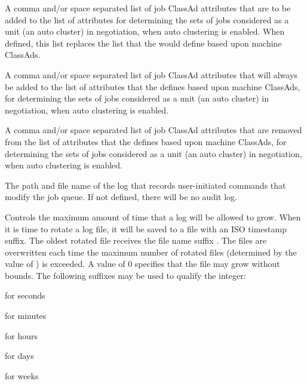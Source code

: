 \begin{description}
\label{param:SignificantAttributes}
\item[\Macro{SIGNIFICANT\_ATTRIBUTES}]
  A comma and/or space separated list of job ClassAd attributes that
  are to be added to the list of attributes for determining
  the sets of jobs considered as a unit (an auto cluster) in negotiation,
  when auto clustering is enabled.
  When defined, this list replaces the list that the  
  would define based upon machine ClassAds.

\label{param:AddSignificantAttributes}
\item[\Macro{ADD\_SIGNIFICANT\_ATTRIBUTES}]
  A comma and/or space separated list of job ClassAd attributes that
  will always be added to the list of attributes that the 
  defines based upon machine ClassAds, for determining
  the sets of jobs considered as a unit (an auto cluster) in negotiation,
  when auto clustering is enabled.

\label{param:RemoveSignificantAttributes}
\item[\Macro{REMOVE\_SIGNIFICANT\_ATTRIBUTES}]
  A comma and/or space separated list of job ClassAd attributes that
  are removed from the list of attributes that the 
  defines based upon machine ClassAds, for determining
  the sets of jobs considered as a unit (an auto cluster) in negotiation,
  when auto clustering is enabled.

\label{param:ScheddAuditLog}
\item[\Macro{SCHEDD\_AUDIT\_LOG}]
  The path and file name of the  log that records
  user-initiated commands that modify the job queue.
  If not defined, there will be no  audit log.

\label{param:MaxScheddAuditLog}
\item[\Macro{MAX\_SCHEDD\_AUDIT\_LOG}]
  Controls the maximum amount of time that a log will be allowed to grow. 
  When it is time to rotate a log file, 
  it will be saved to a file with an ISO timestamp suffix. 
  The oldest rotated file receives the file name suffix . 
  The  files are overwritten each time the maximum number of 
  rotated files 
  (determined by the value of )
  is exceeded. 
  A value of 0 specifies that the file may grow without bounds.
  The following suffixes may be used to qualify the integer: 
\begin{description}
  \item{ for seconds}
  \item{ for minutes}
  \item{ for hours}
  \item{ for days}
  \item{ for weeks}
\end{description}


\end{description}
